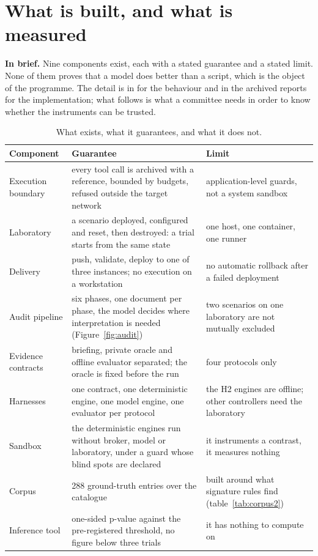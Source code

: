 \section{What is built, and what is measured}
\label{sec:construit}

\textbf{In brief.} Nine components exist, each with a stated guarantee and a
stated limit. None of them proves that a model does better than a script, which
is the object of the programme. The detail is in  for the behaviour
and in the archived reports for the implementation; what follows is what a
committee needs in order to know whether the instruments can be trusted.

\begin{table}[tbp]
\centering
\caption{What exists, what it guarantees, and what it does not.}
\label{tab:composants}
\small
\begin{tabularx}{\linewidth}{@{}>{\raggedright\arraybackslash}p{3.2cm}Y>{\raggedright\arraybackslash}p{3.5cm}@{}}
\toprule
Component & Guarantee & Limit \\
\midrule
Execution boundary & every tool call is archived with a reference, bounded by
budgets, refused outside the target network & application-level guards, not a
system sandbox \\
Laboratory & a scenario deployed, configured and reset, then destroyed: a trial
starts from the same state & one host, one container, one runner \\
Delivery & push, validate, deploy to one of three instances; no execution on a
workstation & no automatic rollback after a failed deployment \\
Audit pipeline & six phases, one document per phase, the model decides where
interpretation is needed (Figure~\ref{fig:audit}) & two scenarios on one
laboratory are not mutually excluded \\
Evidence contracts & briefing, private oracle and offline evaluator separated;
the oracle is fixed before the run & four protocols only \\
Harnesses & one contract, one deterministic engine, one model engine, one evaluator per
protocol & the H2 engines are offline; other controllers need the laboratory \\
Sandbox & the deterministic engines run without broker, model or laboratory, under a
guard whose blind spots are declared & it instruments a contrast, it measures
nothing \\
Corpus & 288 ground-truth entries over the catalogue & built around what signature
rules find (table~\ref{tab:corpus2}) \\
Inference tool & one-sided p-value against the pre-registered threshold, no
figure below three trials & it has nothing to compute on \\
\bottomrule
\end{tabularx}
\end{table}

